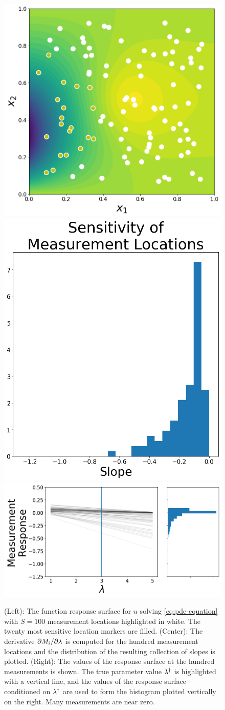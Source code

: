 \begin{figure}
\centering
  \includegraphics[width=0.35\linewidth]{figures/pde/pde_reference_solution}
  \includegraphics[width=0.35\linewidth]{figures/pde/pde_sensitivity_qoi}
  \includegraphics[width=0.675\linewidth]{figures/pde/pde_qoi_response}
\caption{(Left): The function response surface for $u$ solving \eqref{eq:pde-equation} with $S=100$ measurement locations highlighted in white.
The twenty most sensitive location markers are filled.
(Center): The derivative $\partial M_i / \partial \lambda$ is computed for the hundred measurement locations and the distribution of the resulting collection of slopes is plotted.
(Right): The values of the response surface at the hundred measurements is shown. The true parameter value $\lambda^\dagger$ is highlighted with a vertical line, and the values of the response surface conditioned on $\lambda^\dagger$ are used to form the histogram plotted vertically on the right. Many measurements are near zero.
}
\label{fig:pde-response}
\end{figure}

